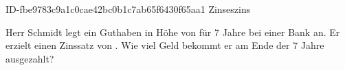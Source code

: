 \begin{exercise}
      {ID-fbe9783c9a1c0cae42bc0b1c7ab65f6430f65aa1}
      {Zinseszins}
  \ifproblem\problem\par
    Herr Schmidt legt ein Guthaben in Höhe von  für \num{7} Jahre bei
    einer Bank an. Er erzielt einen Zinssatz von . Wie viel Geld
    bekommt er am Ende der \num{7} Jahre ausgezahlt?
  \fi
\end{exercise}
